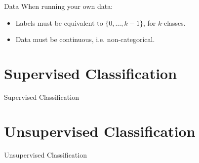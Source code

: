 \documentclass[xcolor=dvipsnames]{beamer}
\begin{document}
\begin{frame}{Data}
    When running your own data:
    \begin{itemize}
        \item Labels must be equivalent to $\{0, \dots, k-1\}$, for $k$-classes.
        \item Data must be continuous, i.e. non-categorical.
    \end{itemize}
\end{frame}


\section{Supervised Classification}
\begin{frame}{Supervised Classification}

\end{frame}



\section{Unsupervised Classification}
\begin{frame}{Unsupervised Classification}

\end{frame}
\end{document}
